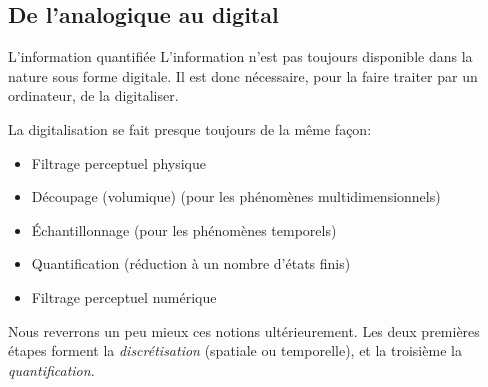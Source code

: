 \subsection{De l'analogique au digital}
\begin{frame}{L'information quantifiée}
  L'information n'est pas toujours disponible dans la nature sous forme
  digitale. Il est donc nécessaire, pour la faire traiter par un ordinateur,
  de la digitaliser.
  
  La digitalisation se fait presque toujours de la même façon:
  \begin{itemize}
  \item Filtrage perceptuel physique
  \item Découpage (volumique) (pour les phénomènes multidimensionnels)
  \item Échantillonnage (pour les phénomènes temporels)
  \item Quantification (réduction à un nombre d'états finis)
  \item Filtrage perceptuel numérique
  \end{itemize}

  Nous reverrons un peu mieux ces notions ultérieurement. Les deux premières
  étapes forment la \emph{discrétisation} (spatiale ou temporelle), et la
  troisième la \emph{quantification}.
\end{frame}
